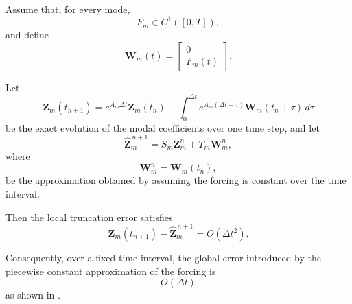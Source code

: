 \documentclass{Configuration_Files/PoliMi3i_thesis}
\begin{document}
\begin{proposition}
Assume that, for every mode,
\begin{equation*}
F_m\in C^1([0,T]),
\end{equation*}
and define
\begin{equation*}
\mathbf W_m(t)
=
\begin{bmatrix}
0\\
F_m(t)
\end{bmatrix}.
\end{equation*}

Let
\begin{equation*}
\mathbf Z_m(t_{n+1})
=
e^{A_m\Delta t}\mathbf Z_m(t_n)
+
\int_0^{\Delta t}
e^{A_m(\Delta t-\tau)}
\mathbf W_m(t_n+\tau)\,d\tau
\end{equation*}
be the exact evolution of the modal coefficients over one time step, and let
\begin{equation*}
\hat{\mathbf Z}_m^{\,n+1}
=
S_m\mathbf Z_m^n
+
T_m\mathbf W_m^n,
\end{equation*}
where
\begin{equation*}
\mathbf W_m^n
=
\mathbf W_m(t_n),
\end{equation*}
be the approximation obtained by assuming the forcing is constant over the time interval.

Then the local truncation error satisfies
\begin{equation*}
\mathbf Z_m(t_{n+1})
-
\hat{\mathbf Z}_m^{\,n+1}
=
O(\Delta t^2).
\end{equation*}

Consequently, over a fixed time interval, the global error introduced by the
piecewise constant approximation of the forcing is
\begin{equation*}
O(\Delta t)
\end{equation*}
as shown in \cite{quarteroni_numerical_2014}.
\end{proposition}
\end{document}
